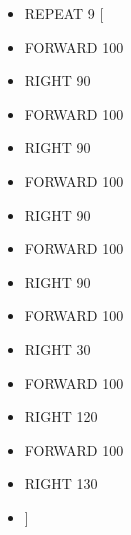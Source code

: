 \begin{minipage}{0.45\textwidth}
\begin{itemize}[itemsep=-3pt,parsep=2pt]
\item[] \hspace{0.5cm} REPEAT 9 [
\item[] \hspace{0.5cm} 	FORWARD 100
\item[] \hspace{0.5cm} 	RIGHT 90
\item[] \hspace{0.5cm} 	FORWARD 100
\item[] \hspace{0.5cm} 	RIGHT 90
\item[] \hspace{0.5cm} 	FORWARD 100
\item[] \hspace{0.5cm} 	RIGHT 90
\item[] \hspace{0.5cm} 	FORWARD 100
\item[] \hspace{0.5cm} 	RIGHT 90
\item[] \hspace{0.5cm} 	FORWARD 100
\item[] \hspace{0.5cm} 	RIGHT 30
\item[] \hspace{0.5cm} 	FORWARD 100
\item[] \hspace{0.5cm} 	RIGHT 120
\item[] \hspace{0.5cm} 	FORWARD 100
\item[] \hspace{0.5cm} 	RIGHT 130
\item[] \hspace{0.5cm} 	]          
\end{itemize}          	          
\end{minipage}

